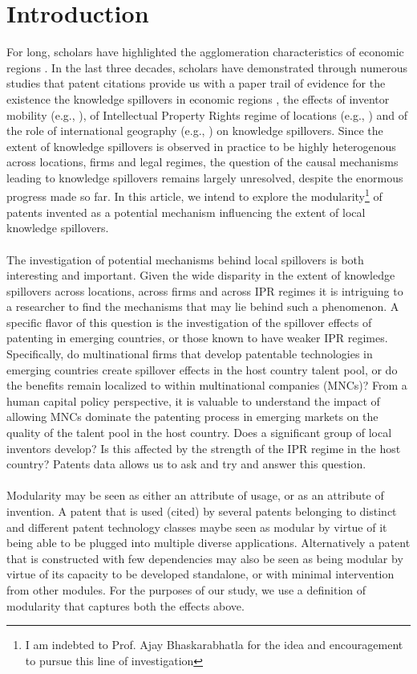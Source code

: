 \documentclass[12pt]{article}
\begin{document}
\section{Introduction}
For long, scholars have  highlighted the agglomeration characteristics of economic regions \citep{Marshall1890}. In the last three decades, scholars have demonstrated through numerous studies that patent citations provide us with a paper trail of evidence for the existence the knowledge spillovers in economic regions \citep{Jaffe1993, Almeida1999},  the effects of inventor mobility (e.g., \cite{Almeida1999}), of Intellectual Property Rights regime of locations (e.g., \cite{Zhao2006}) and of the role of international geography (e.g., \cite{Singh2007}) on knowledge spillovers. Since the extent of knowledge spillovers is observed in practice to be highly heterogenous across locations, firms and legal regimes, the question of the causal mechanisms leading to knowledge spillovers remains largely unresolved, despite the enormous progress made so far. In this article, we intend to explore the modularity\footnote{I am indebted to Prof. Ajay Bhaskarabhatla for the idea and encouragement to pursue this line of investigation} of patents invented as a potential mechanism influencing the extent of local knowledge spillovers.
\\\\
The investigation of potential mechanisms behind local spillovers is both interesting and important. Given the wide disparity in the extent of knowledge spillovers across locations, across firms and across IPR regimes it is intriguing to a researcher to find the mechanisms that may lie behind such a phenomenon. A specific flavor of this question is the investigation of the spillover effects of patenting in emerging countries, or those known to have weaker IPR regimes. Specifically, do multinational firms that develop patentable technologies in emerging countries create spillover effects in the host country talent pool, or do the benefits remain localized to within multinational companies (MNCs)? From a human capital policy perspective, it is valuable to understand the impact of allowing MNCs dominate the patenting process in emerging markets on the quality of the talent pool in the host country. Does a significant group of local inventors develop? Is this affected by the strength of the IPR regime in the host country? Patents data allows us to ask and try and answer this question. 
\\\\
Modularity may be seen as either an attribute of usage, or as an attribute of invention. A patent that is used (cited) by several patents belonging to distinct and different patent technology classes maybe seen as modular by virtue of it being able to be plugged into multiple diverse applications. Alternatively a patent that is constructed with few dependencies may also be seen as being modular by virtue of its capacity to be developed standalone, or with minimal intervention from other modules. For the purposes of our study, we use a definition of modularity that captures both the effects above. 
\end{document}
